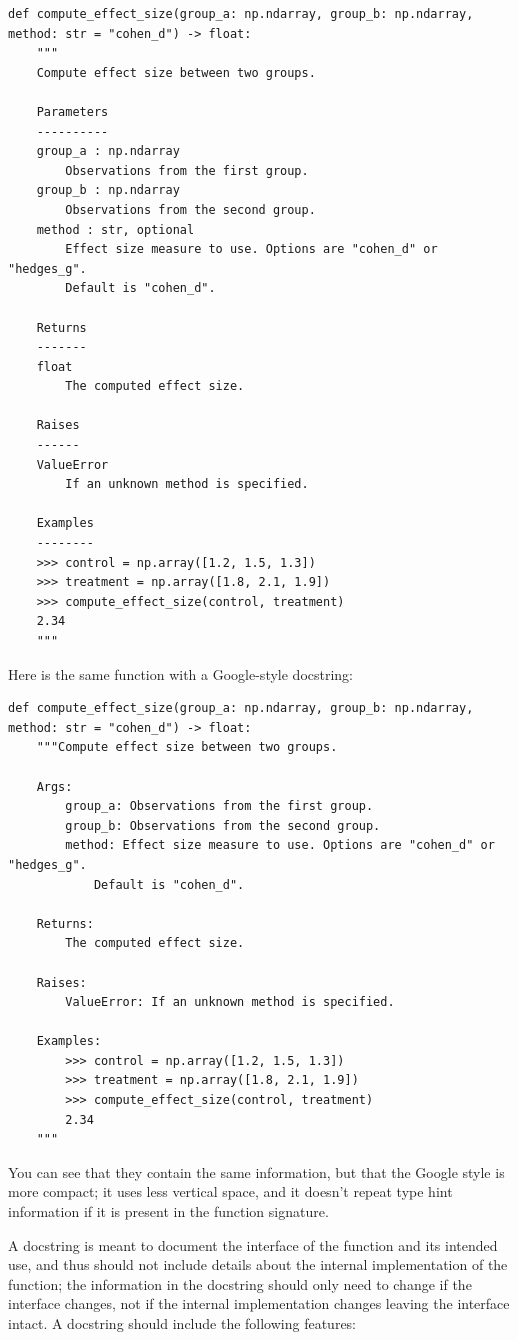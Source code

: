 \begin{lstlisting}[style=Python]
def compute_effect_size(group_a: np.ndarray, group_b: np.ndarray, method: str = "cohen_d") -> float:
    """
    Compute effect size between two groups.

    Parameters
    ----------
    group_a : np.ndarray
        Observations from the first group.
    group_b : np.ndarray
        Observations from the second group.
    method : str, optional
        Effect size measure to use. Options are "cohen_d" or "hedges_g".
        Default is "cohen_d".

    Returns
    -------
    float
        The computed effect size.

    Raises
    ------
    ValueError
        If an unknown method is specified.

    Examples
    --------
    >>> control = np.array([1.2, 1.5, 1.3])
    >>> treatment = np.array([1.8, 2.1, 1.9])
    >>> compute_effect_size(control, treatment)
    2.34
    """
\end{lstlisting}

Here is the same function with a Google-style docstring:

\begin{lstlisting}[style=Python]
def compute_effect_size(group_a: np.ndarray, group_b: np.ndarray, method: str = "cohen_d") -> float:
    """Compute effect size between two groups.

    Args:
        group_a: Observations from the first group.
        group_b: Observations from the second group.
        method: Effect size measure to use. Options are "cohen_d" or "hedges_g".
            Default is "cohen_d".

    Returns:
        The computed effect size.

    Raises:
        ValueError: If an unknown method is specified.

    Examples:
        >>> control = np.array([1.2, 1.5, 1.3])
        >>> treatment = np.array([1.8, 2.1, 1.9])
        >>> compute_effect_size(control, treatment)
        2.34
    """
\end{lstlisting}

You can see that they contain the same information, but that the Google style is more compact; it uses less vertical space, and it doesn't repeat type hint information if it is present in the function signature.

A docstring is meant to document the interface of the function and its intended use, and thus should not include details about the internal implementation of the function; the information in the docstring should only need to change if the interface changes, not if the internal implementation changes leaving the interface intact.  A docstring should include the following features:

